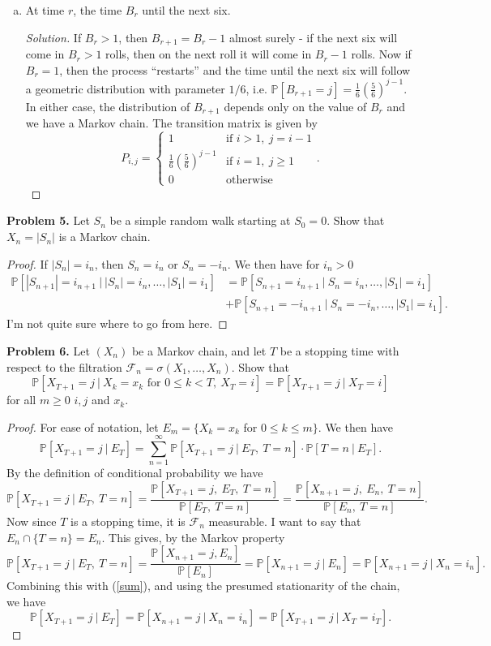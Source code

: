 \documentclass[11pt,letterpaper]{report}
\newcommand{\mcal}[1]{\mathcal{#1}}
\newcommand{\Prob}{\mathbb{P}}
\newenvironment{solution}
{\begin{proof}[Solution]}
{\end{proof}}
\begin{document}
\begin{enumerate}[(a)]
	\item At time $r$, the time $B_r$ until the next six.
	\begin{solution}
		If $B_r > 1$, then $B_{r+1} = B_r - 1$ almost surely - if the next six will come in $B_r>1$ rolls, then on the next roll it will come in $B_r-1$ rolls. Now if $B_r  = 1$, then the process ``restarts'' and the time until the next six will follow a geometric distribution with parameter $1/6$, i.e. $\Prob[B_{r+1} = j] = \frac{1}{6}(\frac{5}{6})^{j-1}$. In either case, the distribution of $B_{r+1}$ depends only on the value of $B_r$ and we have a Markov chain. The transition matrix is given by
		\[
		P_{i,j} = \begin{cases}
			1&\text{if }i>1,\ j = i-1\\
			\frac{1}{6}(\frac{5}{6})^{j-1}&\text{if }i=1,\ j\geq 1\\
			0&\text{otherwise}
		\end{cases}.
		\]
	\end{solution}
\end{enumerate}

\noindent\textbf{Problem 5. }
Let $S_n$ be a simple random walk starting at $S_0 = 0$. Show that $X_n = |S_n|$ is a Markov chain.
\begin{proof}
	If $|S_n| = i_n$, then $S_n = i_n$ or $S_n = -i_n$. We then have for $i_n > 0$
	\begin{align*}
	\Prob[|S_{n+1}| = i_{n+1}\ |\ |S_n| = i_n, \ldots, |S_1|=i_1]&= \Prob[S_{n+1} = i_{n+1}\ |\ S_n = i_n, \ldots, |S_1|=i_1]\\
	&+\Prob[S_{n+1}=-i_{n+1}\ |\ S_n = -i_n, \ldots, |S_1|=i_1].
	\end{align*}
	I'm not quite sure where to go from here.
\end{proof}

\noindent\textbf{Problem 6. }
Let $(X_n)$ be a Markov chain, and let $T$ be a stopping time with respect to the filtration $\mcal{F}_n = \sigma(X_1, \ldots, X_n)$. Show that
\[
\Prob[X_{T+1}=j\ |\ X_k = x_k\text{ for }0\leq k<T,\ X_T = i] = \Prob[X_{T+1}=j\ |\ X_T=i]
\]
for all $m\geq 0$ $i,j$ and $x_k$.
\begin{proof}
	For ease of notation, let $E_m = \{X_k = x_k$ for $0\leq k\leq m\}$. We then have
	\begin{equation}\label{sum}
	\Prob[X_{T+1} = j\ |\ E_T]= \sum_{n=1}^\infty\Prob[X_{T+1}=j\ |\ E_T,\ T=n]\cdot\Prob[T=n\ |\ E_T].
	\end{equation}
	By the definition of conditional probability we have
	\[
	\Prob[X_{T+1}=j\ |\ E_T,\ T=n] = \frac{\Prob[X_{T+1}=j,\ E_T,\ T=n]}{\Prob[E_T,\ T=n]} = \frac{\Prob[X_{n+1}=j,\ E_n,\ T=n]}{\Prob[E_n,\ T=n]}.
	\]
	Now since $T$ is a stopping time, it is $\mcal{F}_n$ measurable. I want to say that $E_n\cap \{T=n\} = E_n$. This gives, by the Markov property
	\[
	\Prob[X_{T+1}=j\ |\ E_T,\ T=n] = \frac{\Prob[X_{n+1}=j, E_n]}{\Prob[E_n]} = \Prob[X_{n+1}=j\ |\ E_n] = \Prob[X_{n+1}=j\ |\ X_n = i_n].
	\]
	Combining this with (\ref{sum}), and using the presumed stationarity of the chain, we have
	\[
	\Prob[X_{T+1} =j\ |\ E_T] = \Prob[X_{n+1}=j\ |\ X_n = i_n] = \Prob[X_{T+1}=j\ |\ X_T=i_T].
	\]
\end{proof}
\end{document}
